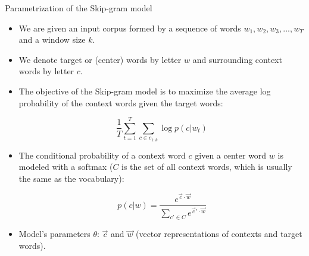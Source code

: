 \documentclass[handout]{beamer}
\begin{document}

\begin{frame}{Parametrization of the Skip-gram model}
\begin{scriptsize}
\begin{itemize}

\item  We are given an input corpus formed by a sequence of  words $w_1, w_2, w_3, . . . , w_T$ and a window size $k$.

\item We denote target or (center) words by letter $w$ and surrounding context words by letter $c$.

\item The objective of the Skip-gram model is to maximize the average log probability of the context words given the target words:

\begin{displaymath}
 \frac{1}{T} \sum_{t=1}^T \sum_{c \in c_{1:k}}  \log p(c|w_t)
\end{displaymath}


\item The conditional probability of a context word $c$ given a center word $w$ is modeled with a softmax ($C$ is the set of all context words, which is usually the same as the vocabulary):


\begin{displaymath}
p(c|w) = \frac{e^{\vec{c}\cdot \vec{w}}}{ \sum_{c'\in C} e^{\vec{c}'\cdot \vec{w}}}
\end{displaymath}

\item Model's parameters $\theta$: $\vec{c}$ and $\vec{w}$ (vector representations of contexts and target words).

\end{itemize}
\end{scriptsize}
\end{frame}
\end{document}
